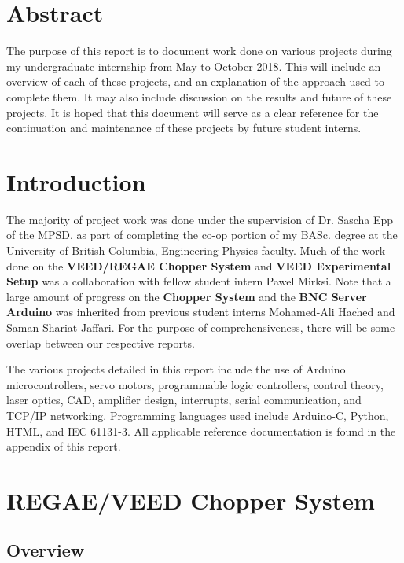 \documentclass{article}
\begin{document}
\tableofcontents
\listoffigures
\pagebreak

\section{Abstract} \label{abstract}

   The purpose of this report is to document work done on various projects during my undergraduate internship from May to October 2018.  This will include an overview of each of these projects, and an explanation of the approach used to complete them. It may also include discussion on the results and future of these projects. It is hoped that this document will serve as a clear reference for the continuation and maintenance of these projects by future student interns.

\section{Introduction} \label{introduction}

    The majority of project work was done under the supervision of Dr. Sascha Epp of the MPSD, as part of completing the co-op portion of my BASc. degree at the University of British Columbia, Engineering Physics faculty. Much of the work done on the \textbf{VEED/REGAE Chopper System} and \textbf{VEED Experimental Setup} was a collaboration with fellow student intern Pawel Mirksi.  Note that a large amount of progress on the \textbf{Chopper System} and the \textbf{BNC Server Arduino} was inherited from previous student interns Mohamed-Ali Hached and Saman Shariat Jaffari. For the purpose of comprehensiveness, there will be some overlap between our respective reports.
    
    The various projects detailed in this report include the use of Arduino microcontrollers, servo motors, programmable logic controllers, control theory, laser optics, CAD, amplifier design, interrupts, serial communication, and TCP/IP networking. Programming languages used include Arduino-C, Python, HTML, and IEC 61131-3. All applicable reference documentation is found in the appendix of this report.

\section{REGAE/VEED Chopper System} \label{chopper_system}

    \subsection{Overview} \label{overview}
    
\end{document}
